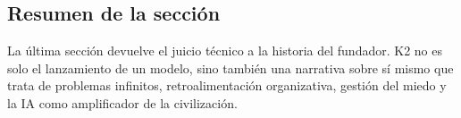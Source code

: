 \subsection{Resumen de la sección}

La última sección devuelve el juicio técnico a la historia del fundador. K2 no es solo el lanzamiento de un modelo, sino también una narrativa sobre sí mismo que trata de problemas infinitos, retroalimentación organizativa, gestión del miedo y la IA como amplificador de la civilización.
